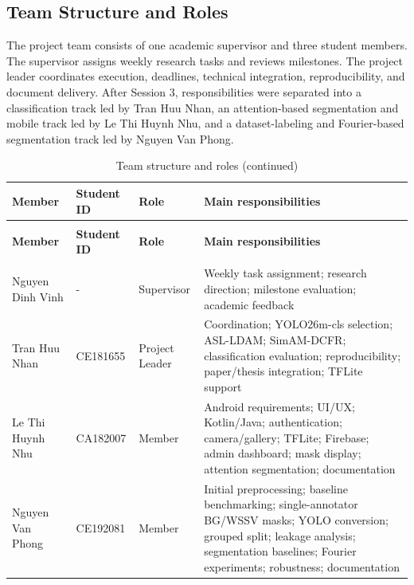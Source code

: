\subsection{Team Structure and Roles}
The project team consists of one academic supervisor and three student members. The supervisor assigns weekly research tasks and reviews milestones. The project leader coordinates execution, deadlines, technical integration, reproducibility, and document delivery. After Session 3, responsibilities were separated into a classification track led by Tran Huu Nhan, an attention-based segmentation and mobile track led by Le Thi Huynh Nhu, and a dataset-labeling and Fourier-based segmentation track led by Nguyen Van Phong.\par
\begingroup
\CVioTableSetup
\begin{longtable}{|>{\centering\arraybackslash}p{2.04cm}|>{\centering\arraybackslash}p{1.50cm}|>{\centering\arraybackslash}p{1.84cm}|>{\centering\arraybackslash}p{5.17cm}|}
\caption{Team structure and roles}\\
\hline
\rowcolor{cvioPeach}\textbf{Member} & \textbf{Student ID} & \textbf{Role} & \textbf{Main responsibilities} \\ \hline
\endfirsthead
\caption[]{Team structure and roles (continued)}\\
\hline
\rowcolor{cvioPeach}\textbf{Member} & \textbf{Student ID} & \textbf{Role} & \textbf{Main responsibilities} \\ \hline
\endhead
\hline
\multicolumn{4}{r}{\footnotesize Continued on next page}\\
\endfoot
\hline
\endlastfoot
Nguyen Dinh Vinh & - & Supervisor & Weekly task assignment; research direction; milestone evaluation; academic feedback \\ \hline
Tran Huu Nhan & CE181655 & Project Leader & Coordination; YOLO26m-cls selection; ASL-LDAM; SimAM-DCFR; classification evaluation; reproducibility; paper/thesis integration; TFLite support \\ \hline
Le Thi Huynh Nhu & CA182007 & Member & Android requirements; UI/UX; Kotlin/Java; authentication; camera/gallery; TFLite; Firebase; admin dashboard; mask display; attention segmentation; documentation \\ \hline
Nguyen Van Phong & CE192081 & Member & Initial preprocessing; baseline benchmarking; single-annotator BG/WSSV masks; YOLO conversion; grouped split; leakage analysis; segmentation baselines; Fourier experiments; robustness; documentation \\ \hline
\end{longtable}
